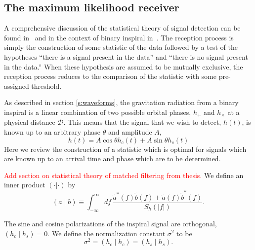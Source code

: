 \subsection{The maximum likelihood receiver}
\label{ss:maxrec}

A comprehensive discussion of the statistical theory of signal detection can
be found in~\cite{wz} and in the context of binary inspiral
in~\cite{finn,finnchernoff}. The reception process is simply the construction
of some statistic of the data followed by a test of the hypotheses ``there is
a signal present in the data'' and ``there is no signal present in the data.''
When these hypothesis are assumed to be mutually exclusive, the reception
process reduces to the comparison of the statistic with some pre-assigned
threshold. 

As described in section \ref{s:waveforms}, the gravitation radiation from a
binary inspiral is a linear combination of two possible orbital phases,
$h_{+}$ and $h_{\times}$ at a physical distance $\mathcal{D}$. This means that
the signal that we wish to detect, $h(t)$, is known up to an arbitrary phase
$\theta$ and amplitude $A$,
\begin{equation}
h(t) = A \cos \theta h_c(t) + A \sin \theta h_s(t)
\end{equation}
Here we review the construction of a statistic which is optimal for
signals which are known up to an arrival time and phase which are to be
determined.

\textcolor{red}{Add section on statistical theory of matched filtering from
thesis.} We define an inner product $(\cdot|\cdot)$ by
\begin{equation}
\label{eq:innerproduct}
  (a\mid b) \equiv \int_{-\infty}^\infty df\,
  \frac{\tilde{a}^\ast(f)\tilde{b}(f)+\tilde{a}(f)\tilde{b}^\ast(f)}
       {S_h(|f|)}.
\end{equation}

The sine and cosine polarizations of the inspiral signal are orthogonal,
$\left(h_c\mid h_s\right) = 0$. We define the normalization constant
$\sigma^2$ to be
\begin{equation}
\sigma^2 = \left(h_c\mid h_c\right) = \left(h_s\mid h_s\right).
\end{equation}

